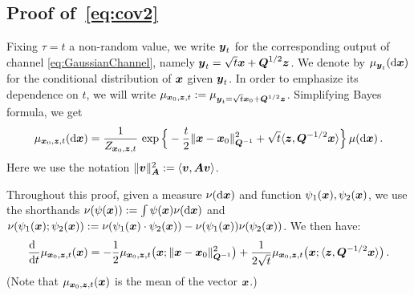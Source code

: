 \documentclass[11pt]{article}
\numberwithin{equation}{section}
\theoremstyle{myremark}
\theoremstyle{myremark}
\theoremstyle{myexample}
\newcommand{\1}{\mathbf{1}}
\begin{document}
  
\subsection{Proof of~\eqref{eq:cov2}}

  Fixing $\tau=t$ a non-random value, we write $\by_t$ for the corresponding output of 
  channel \eqref{eq:GaussianChannel}, namely $\by_t=\sqrt{t}\bx+\bQ^{1/2}\bz$. 
  We denote by $\mu_{\by_t}(\de\bx)$ for the conditional distribution of 
  $\bx$ given $\by_t$. In order to emphasize its
  dependence on $t$, we will write   $\muc :=\mu_{\by_t=\sqrt{t}\bx_0+\bQ^{1/2}\bz}$.
  Simplifying Bayes formula, we get 
  \begin{align}
  \muc(\de\bx) = \frac{1}{Z_{\bx_0,\bz,t}}\, 
  \exp\Big\{-\frac{t}{2}\|\bx-\bx_0\|_{\bQ^{-1}}^2 +\sqrt{t} \<\bz,\bQ^{-1/2}\bx\>\Big\}\,
  \mu(\de\bx) \, .
  \end{align} 
  Here we use the notation $\|\bv\|^2_{\bA}:= \<\bv,\bA\bv\>$.  %
  
  Throughout this proof, given a measure $\nu(\de\bx)$ and function $\psi_1(\bx),\psi_2(\bx)$, 
  we use the  shorthands
  $\nu(\psi(\bx)) := \int\psi(\bx)\nu(\de\bx)$ and $\nu(\psi_1(\bx);\psi_2(\bx)):=
  \nu(\psi_1(\bx)\cdot\psi_2(\bx))-\nu(\psi_1(\bx))\nu(\psi_2(\bx))$.
  We then have:
  \begin{align}
  \frac{\de\phantom{t}}{\de t}\muc(\bx) = -\frac{1}{2}\muc\big(\bx;\|\bx-\bx_0\|_{\bQ^{-1}}^2\big)
  +\frac{1}{2\sqrt{t}}\muc\big(\bx;\<\bz,\bQ^{-1/2}\bx\>\big)\, .
  \end{align}
  (Note that $\muc(\bx)$ is the mean of the vector $\bx$.)
  
\end{document}
